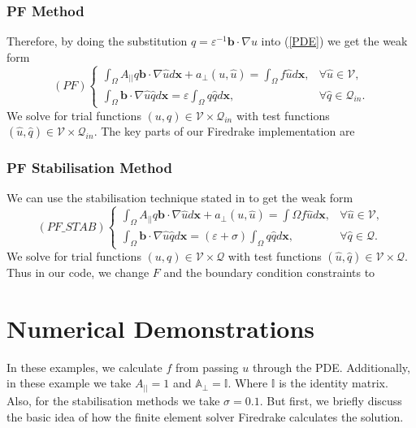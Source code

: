 \documentclass[12pt]{ociamthesis}
\begin{document}
\subsection{PF Method}
Therefore, by doing the substitution $q=\varepsilon^{-1} \mathbf{b} \cdot \nabla u$ into (\ref{PDE}) we get the weak form
\begin{equation} \label{PF_w}
(PF)
\begin{cases}
\int_{\Omega}A_{||}q\mathbf{b} \cdot \nabla \hat{u}  d\mathbf{x} + a_{\perp}(u, \hat{u}) 
= \int_{\Omega} f \hat{u} d\mathbf{x},
&\forall \hat{u} \in \mathcal{V},\\
\int_{\Omega}\mathbf{b} \cdot \nabla \hat{u}\hat{q} d\mathbf{x} 
= \varepsilon \int_{\Omega}q\hat{q} d \mathbf{x}, 
&\forall \hat{q} \in \mathcal{Q}_{in}.
\end{cases}
\end{equation}
We solve for trial functions $(u,q) \in \mathcal{V} \times \mathcal{Q}_{in}$ with test functions $(\hat{u}, \hat{q}) \in \mathcal{V} \times \mathcal{Q}_{in}$. The key parts of our  Firedrake \cite{Dragon} implementation are


\subsection{PF Stabilisation Method} \label{PF_STAB}
We can use the stabilisation technique stated in \cite{STAB} to get the weak form
\begin{equation} \label{PF_STAB_w}
(PF\_STAB)
\begin{cases}
\int_{\Omega}A_{||}q\mathbf{b} \cdot \nabla \hat{u}  d\mathbf{x} + a_{\perp}(u, \hat{u}) 
= \int{\Omega} f \hat{u} d\mathbf{x},
&\forall \hat{u} \in \mathcal{V},\\
\int_{\Omega}\mathbf{b} \cdot \nabla \hat{u}\hat{q} d\mathbf{x} 
= (\varepsilon + \sigma)\int_{\Omega}q\hat{q} d \mathbf{x}, 
&\forall \hat{q} \in \mathcal{Q}.
\end{cases}
\end{equation}
We solve for trial functions $(u,q) \in \mathcal{V} \times \mathcal{Q}$ with test functions $(\hat{u}, \hat{q}) \in \mathcal{V} \times \mathcal{Q}$. Thus in our code, we change $F$ and the boundary condition constraints to


\chapter{Numerical Demonstrations}
In these examples, we calculate $f$ from passing $u$ through the PDE. Additionally, in these example we take $A_{||}=1$ and $\mathbb{A}_{\perp} = \mathbb{I}$. Where $\mathbb{I}$ is the identity matrix. Also, for the stabilisation methods we take $\sigma=0.1$. But first, we briefly discuss the basic idea of how the finite element solver Firedrake \cite{Dragon} calculates the solution. 
\end{document}
